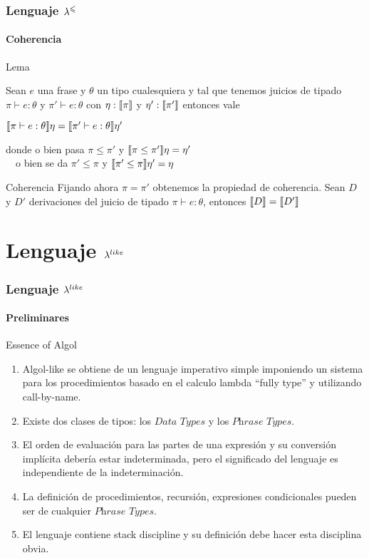 \documentclass{beamer}
\begin{document}
\begin{frame}
\frametitle{Lenguaje $\lambda^{\leqslant}$}
\framesubtitle{Coherencia}

\begin{block}{Lema}

Sean $e$ una frase y $\theta$ un tipo cualesquiera y tal que tenemos 
juicios de tipado $\pi \vdash e : \theta$ y $\pi' \vdash e : \theta$
con $\eta : \llbracket \pi \rrbracket$ y $\eta' : \llbracket \pi' \rrbracket$ entonces vale

\begin{center}
$\llbracket \pi \vdash e : \theta \rrbracket\eta = \llbracket \pi' \vdash e : \theta \rrbracket\eta'$
\end{center}

\noindent
donde o bien pasa $\pi \leq \pi'$ y $\llbracket \pi \leq \pi' \rrbracket\eta = \eta'$\\
\quad \quad \ \
o bien se da $\pi' \leq \pi$ y $\llbracket \pi' \leq \pi \rrbracket\eta' = \eta$

\end{block}

\begin{block}{Coherencia}
Fijando ahora $\pi = \pi'$ obtenemos la propiedad de coherencia. Sean $D$ y $D'$
derivaciones del juicio de tipado $\pi \vdash e : \theta$, entonces 
$\llbracket D \rrbracket = \llbracket D' \rrbracket$
\end{block}

\end{frame}

\section{Lenguaje $\lambda^{like}$}

\begin{frame}
\frametitle{Lenguaje $\lambda^{like}$}
\framesubtitle{Preliminares}

\begin{block}{Essence of Algol}\small
\begin{enumerate}
\item Algol-like se obtiene de un lenguaje imperativo simple imponiendo un
sistema para los procedimientos basado en el calculo lambda ``fully type'' y utilizando
call-by-name.

\item Existe dos clases de tipos: los $\textit{Data Types}$ y los $\textit{Phrase Types}$.

\item El orden de evaluaci\'on para las partes de una expresi\'on y su
conversi\'on impl\'icita deber\'ia estar indeterminada, pero el significado
del lenguaje es independiente de la indeterminaci\'on.

\item La definici\'on de procedimientos, recursi\'on, expresiones condicionales
pueden ser de cualquier $\textit{Phrase Types}$.

\item El lenguaje contiene stack discipline y su definici\'on debe hacer esta disciplina
obvia.
\end{enumerate}

\end{block}

\end{frame}
\end{document}

